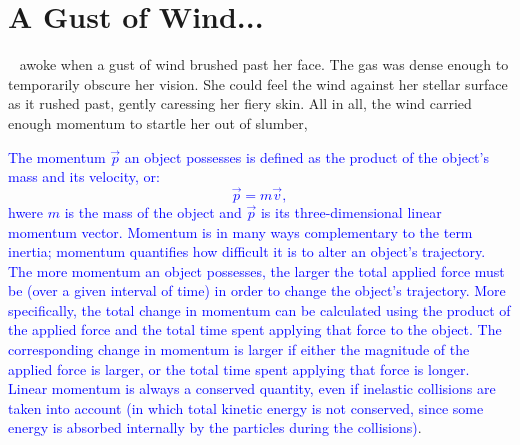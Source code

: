 \documentclass[main.tex]{subfiles}
\begin{document}

\chapter{A Gust of Wind...}

\par \nar \rmsterope~ awoke when a gust of wind brushed past her face.  The gas was dense enough to temporarily obscure her vision.  She could feel the wind against her stellar surface as it rushed past, gently caressing her fiery skin.  All in all, the wind carried enough momentum to startle her out of slumber,


\begin{tcolorbox}[sharp corners, colback=blue!30, colframe=blue!80!blue, title=Linear Momentum]
\par \textcolor{blue} {The momentum $\vec{p}$ an object possesses is defined as the product of the object's mass and its velocity, or:
\begin{equation}
\vec{p} = m\vec{v},
\end{equation}
hwere $m$ is the mass of the object and $\vec{p}$ is its three-dimensional linear momentum vector.  Momentum is in many ways complementary to the term inertia; momentum quantifies how difficult it is to alter an object's trajectory.  The more momentum an object possesses, the larger the total applied force must be (over a given interval of time) in order to change the object's trajectory.  More specifically, the total change in momentum can be calculated using the product of the applied force and the total time spent applying that force to the object.  The corresponding change in momentum is larger if either the magnitude of the applied force is larger, or the total time spent applying that force is longer.  Linear momentum is always a conserved quantity, even if inelastic collisions are taken into account (in which total kinetic energy is not conserved, since some energy is absorbed internally by the particles during the collisions)}.  
\end{tcolorbox}
\end{document}
